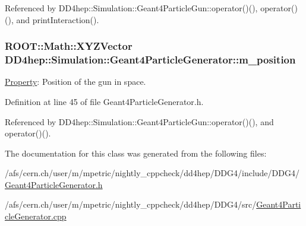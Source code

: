 Referenced by DD4hep::Simulation::Geant4ParticleGun::operator()(), operator()(), and printInteraction().\hypertarget{class_d_d4hep_1_1_simulation_1_1_geant4_particle_generator_a6ee07c5b63244214bb70499dd66eb26a}{
\subsubsection[{m\_\-position}]{\setlength{\rightskip}{0pt plus 5cm}ROOT::Math::XYZVector {\bf DD4hep::Simulation::Geant4ParticleGenerator::m\_\-position}}}
\label{class_d_d4hep_1_1_simulation_1_1_geant4_particle_generator_a6ee07c5b63244214bb70499dd66eb26a}


\hyperlink{class_d_d4hep_1_1_property}{Property}: Position of the gun in space. 

Definition at line 45 of file Geant4ParticleGenerator.h.

Referenced by DD4hep::Simulation::Geant4ParticleGun::operator()(), and operator()().

The documentation for this class was generated from the following files:\begin{DoxyCompactItemize}
\item 
/afs/cern.ch/user/m/mpetric/nightly\_\-cppcheck/dd4hep/DDG4/include/DDG4/\hyperlink{_geant4_particle_generator_8h}{Geant4ParticleGenerator.h}\item 
/afs/cern.ch/user/m/mpetric/nightly\_\-cppcheck/dd4hep/DDG4/src/\hyperlink{_geant4_particle_generator_8cpp}{Geant4ParticleGenerator.cpp}\end{DoxyCompactItemize}
